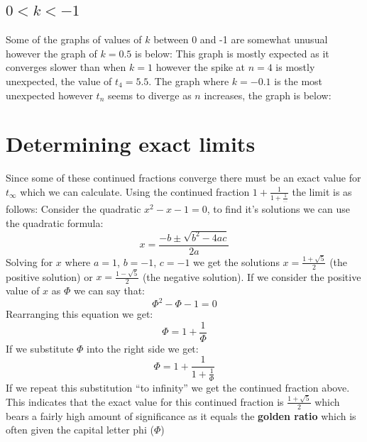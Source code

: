 \documentclass[11pt]{article}
\begin{document}
\subsection{\(0 < k < -1\)}
\label{sec:org2181fcc}
Some of the graphs of values of \(k\) between 0 and -1 are somewhat unusual however the graph of \(k=0.5\) is below:
This graph is mostly expected as it converges slower than when \(k=1\) however the spike at \(n=4\) is mostly unexpected, the value of \(t_4=5.5\).
The graph where \(k=-0.1\) is the most unexpected however \(t_n\) seems to diverge as \(n\) increases, the graph is below:
\section{Determining exact limits}
\label{sec:org1ca692f}
Since some of these continued fractions converge there must be an exact value for \(t_{\infty}\) which we can calculate. Using the continued fraction \(1+\frac{1}{1+\frac{1}{\dots}}\) the limit is as follows:
Consider the quadratic \(x^2-x-1=0\), to find it's solutions we can use the quadratic formula:
\begin{equation*}
x=\frac{-b \pm \sqrt{b^2 - 4ac}}{2a}
\end{equation*}
Solving for \(x\) where \(a=1\), \(b=-1\), \(c=-1\) we get the solutions \(x=\frac{1+\sqrt{5}}{2}\) (the positive solution) or \(x=\frac{1-\sqrt{5}}{2}\) (the negative solution). If we consider the positive value of \(x\) as \(\Phi\) we can say that:
\begin{equation*}
\Phi^2-\Phi-1=0
\end{equation*}
Rearranging this equation we get:
\begin{equation*}
\Phi=1+\frac{1}{\Phi}
\end{equation*}
If we substitute \(\Phi\) into the right side we get:
\begin{equation*}
\Phi=1+\frac{1}{1+\frac{1}{\Phi}}
\end{equation*}
If we repeat this substitution ``to infinity'' we get the continued fraction above.
This indicates that the exact value for this continued fraction is \(\frac{1+\sqrt{5}}{2}\) which bears a fairly high amount of significance as it equals the \textbf{golden ratio} which is often given the capital letter phi (\(\Phi\))
\end{document}
